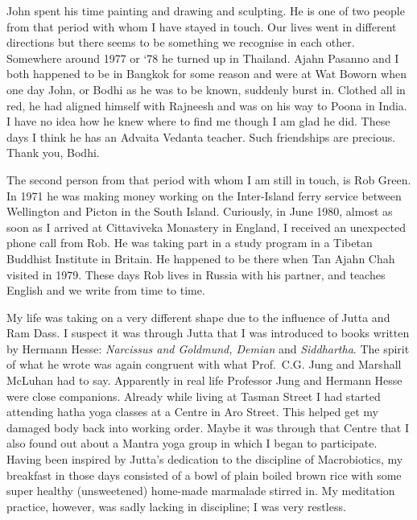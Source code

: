 John spent his time painting and drawing and sculpting. He is one of two
people from that period with whom I have stayed in touch. Our lives went
in different directions but there seems to be something we recognise in
each other. Somewhere around 1977 or `78 he turned up in Thailand. Ajahn
Pasanno and I both happened to be in Bangkok for some reason and were at
Wat Boworn when one day John, or Bodhi as he was to be known, suddenly
burst in. Clothed all in red, he had aligned himself with Rajneesh and
was on his way to Poona in India. I have no idea how he knew where to
find me though I am glad he did. These days I think he has an Advaita
Vedanta teacher. Such friendships are precious. Thank you, Bodhi.

The second person from that period with whom I am still in touch, is Rob
Green. In 1971 he was making money working on the Inter-Island ferry
service between Wellington and Picton in the South Island. Curiously, in
June 1980, almost as soon as I arrived at Cittaviveka Monastery in
England, I received an unexpected phone call from Rob. He was taking
part in a study program in a Tibetan Buddhist Institute in Britain. He
happened to be there when Tan Ajahn Chah visited in 1979. These days Rob
lives in Russia with his partner, and teaches English and we write from
time to time.

My life was taking on a very different shape due to the influence of
Jutta and Ram Dass. I suspect it was through Jutta that I was introduced
to books written by Hermann Hesse: \emph{Narcissus and Goldmund, Demian}
and \emph{Siddhartha}. The spirit of what he wrote was again congruent
with what Prof.~C.G. Jung and Marshall McLuhan had to say. Apparently in
real life Professor Jung and Hermann Hesse were close companions.
Already while living at Tasman Street I had started attending hatha yoga
classes at a Centre in Aro Street. This helped get my damaged body back
into working order. Maybe it was through that Centre that I also found
out about a Mantra yoga group in which I began to participate. Having
been inspired by Jutta's dedication to the discipline of Macrobiotics, my breakfast in
those days consisted of a bowl of plain boiled brown rice with some
super healthy (unsweetened) home-made marmalade stirred in. My
meditation practice, however, was sadly lacking in discipline; I was
very restless.

